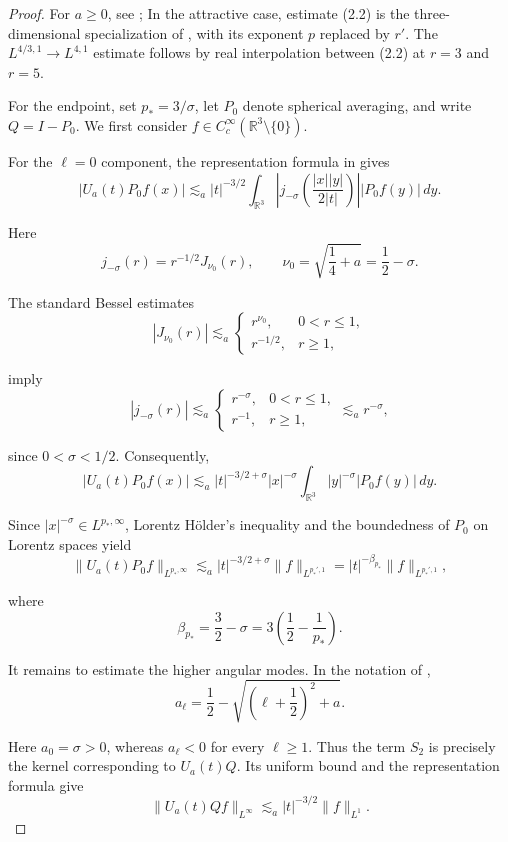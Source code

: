 \documentclass[preprint,12pt]{elsarticle}
\numberwithin{equation}{section}
\theoremstyle{definition}
\theoremstyle{remark}
\begin{document}
\begin{proof}
For $a\geq0$, see
\cite[Theorem~1.11(i)]{FanelliDecay}; In the attractive case, estimate (2.2) is the three-dimensional specialization of \cite[Corollary~1.7]{MiaoSuZheng}, with its exponent $p$ replaced by $r'$. The $L^{4/3,1}\to L^{4,1}$ estimate follows by real interpolation between (2.2) at $r=3$ and $r=5$.


For the endpoint, set \(p_*=3/\sigma\), let \(P_0\) denote spherical averaging, and write \(Q=I-P_0\). We first consider \(f\in C_c^\infty(\mathbb R^3\setminus\{0\})\).

For the \(\ell=0\) component, the representation formula in \cite[Theorem~1.3 and Eqs.~(1.16), (1.27)]{FanelliDecay} gives
\[
|U_a(t)P_0f(x)|
\lesssim_a |t|^{-3/2}
\int_{\mathbb R^3}
\left|j_{-\sigma}\left(\frac{|x||y|}{2|t|}\right)\right|
|P_0f(y)|\,dy.
\]

Here
\[
j_{-\sigma}(r)=r^{-1/2}J_{\nu_0}(r),
\qquad
\nu_0=\sqrt{\frac14+a}=\frac12-\sigma.
\]

The standard Bessel estimates
\[
|J_{\nu_0}(r)|\lesssim_a
\begin{cases}
	r^{\nu_0},&0<r\le1,\\
	r^{-1/2},&r\ge1,
\end{cases}
\]

imply
\[
|j_{-\sigma}(r)|
\lesssim_a
\begin{cases}
	r^{-\sigma},&0<r\le1,\\
	r^{-1},&r\ge1,
\end{cases}
\lesssim_a r^{-\sigma},
\]

since \(0<\sigma<1/2\). Consequently,
\[
|U_a(t)P_0f(x)|
\lesssim_a
|t|^{-3/2+\sigma}|x|^{-\sigma}
\int_{\mathbb R^3}|y|^{-\sigma}|P_0f(y)|\,dy.
\]

Since \(|x|^{-\sigma}\in L^{p_*,\infty}\), Lorentz Hölder’s inequality and the boundedness of \(P_0\) on Lorentz spaces yield
\[
\|U_a(t)P_0f\|_{L^{p_*,\infty}}
\lesssim_a
|t|^{-3/2+\sigma}\|f\|_{L^{p_*',1}}
=
|t|^{-\beta_{p_*}}\|f\|_{L^{p_*',1}},
\]

where
\[
\beta_{p_*}=\frac32-\sigma
=3\left(\frac12-\frac1{p_*}\right).
\]

It remains to estimate the higher angular modes. In the notation of \cite[Eqs.~(6.5), (6.6)]{FanelliDecay},
\[
a_\ell=\frac12-\sqrt{\left(\ell+\frac12\right)^2+a}.
\]

Here \(a_0=\sigma>0\), whereas \(a_\ell<0\) for every \(\ell\ge1\). Thus the term \(S_2\) is precisely the kernel corresponding to \(U_a(t)Q\). Its uniform bound \cite[Eq.~(6.16)]{FanelliDecay} and the representation formula give
\[
\|U_a(t)Qf\|_{L^\infty}
\lesssim_a |t|^{-3/2}\|f\|_{L^1}.
\]


\end{proof}
\end{document}
